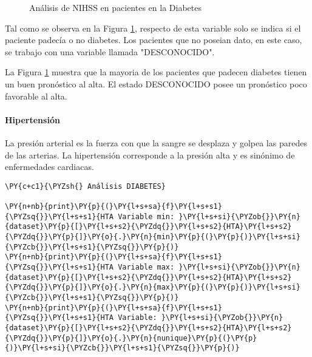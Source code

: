 \begin{center}
    	\begin{figure}[H]
	\centering
	\caption{Análisis de NIHSS en pacientes en la Diabetes}
	\label{fig:aNISSd}
	\end{figure}
\end{center}
    
    Tal como se observa en la Figura \ref{fig:aNISSd}, respecto de esta variable solo se indica si el paciente padecía o no diabetes. Los pacientes que no poseian dato, en este caso, se trabajo con una variable llamada "DESCONOCIDO".
    \par La Figura \ref{fig:aNISSd} muestra que la mayoria de los pacientes que padecen diabetes tienen un buen pronóstico al alta. El estado DESCONOCIDO posee un pronóstico poco favorable al alta.


    \hypertarget{hipertensiuxf3n}{%
\paragraph{Hipertensión}\label{hipertensiuxf3n}}

La presión arterial es la fuerza con que la sangre se desplaza y golpea las paredes de las arterias. La hipertensión corresponde a la presión alta y es sinónimo de enfermedades cardiacas.

    \begin{tcolorbox}[breakable, size=fbox, boxrule=1pt, pad at break*=1mm,colback=cellbackground, colframe=cellborder]
\begin{Verbatim}[commandchars=\\\{\}]
\PY{c+c1}{\PYZsh{} Análisis DIABETES}

\PY{n+nb}{print}\PY{p}{(}\PY{l+s+sa}{f}\PY{l+s+s1}{\PYZsq{}}\PY{l+s+s1}{HTA Variable min: }\PY{l+s+si}{\PYZob{}}\PY{n}{dataset}\PY{p}{[}\PY{l+s+s2}{\PYZdq{}}\PY{l+s+s2}{HTA}\PY{l+s+s2}{\PYZdq{}}\PY{p}{]}\PY{o}{.}\PY{n}{min}\PY{p}{(}\PY{p}{)}\PY{l+s+si}{\PYZcb{}}\PY{l+s+s1}{\PYZsq{}}\PY{p}{)}
\PY{n+nb}{print}\PY{p}{(}\PY{l+s+sa}{f}\PY{l+s+s1}{\PYZsq{}}\PY{l+s+s1}{HTA Variable max: }\PY{l+s+si}{\PYZob{}}\PY{n}{dataset}\PY{p}{[}\PY{l+s+s2}{\PYZdq{}}\PY{l+s+s2}{HTA}\PY{l+s+s2}{\PYZdq{}}\PY{p}{]}\PY{o}{.}\PY{n}{max}\PY{p}{(}\PY{p}{)}\PY{l+s+si}{\PYZcb{}}\PY{l+s+s1}{\PYZsq{}}\PY{p}{)}
\PY{n+nb}{print}\PY{p}{(}\PY{l+s+sa}{f}\PY{l+s+s1}{\PYZsq{}}\PY{l+s+s1}{HTA Variable: }\PY{l+s+si}{\PYZob{}}\PY{n}{dataset}\PY{p}{[}\PY{l+s+s2}{\PYZdq{}}\PY{l+s+s2}{HTA}\PY{l+s+s2}{\PYZdq{}}\PY{p}{]}\PY{o}{.}\PY{n}{nunique}\PY{p}{(}\PY{p}{)}\PY{l+s+si}{\PYZcb{}}\PY{l+s+s1}{\PYZsq{}}\PY{p}{)}
\end{Verbatim}
\end{tcolorbox}

